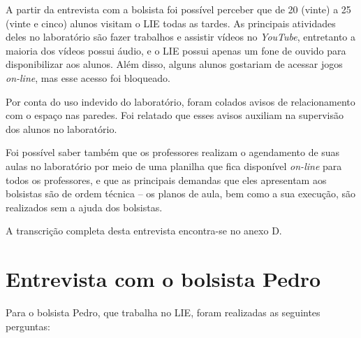 A partir da entrevista com a bolsista foi possível perceber que de 20 (vinte) a 25 (vinte e cinco) alunos visitam o LIE todas as tardes. As principais atividades deles no laboratório são fazer trabalhos e assistir vídeos no \textit{YouTube}, entretanto a maioria dos vídeos possui áudio, e o LIE possui apenas um fone de ouvido para disponibilizar aos alunos. Além disso, alguns alunos gostariam de acessar jogos \textit{on-line}, mas esse acesso foi bloqueado.

Por conta do uso indevido do laboratório, foram colados avisos de relacionamento com o espaço nas paredes. Foi relatado que esses avisos auxiliam na supervisão dos alunos no laboratório.

Foi possível saber também que os professores realizam o agendamento de suas aulas no laboratório por meio de uma planilha que fica disponível \textit{on-line} para todos os professores, e que as principais demandas que eles apresentam aos bolsistas são de ordem técnica -- os planos de aula, bem como a sua execução, são realizados sem a ajuda dos bolsistas.

A transcrição completa desta entrevista encontra-se no anexo D.

\section{Entrevista com o bolsista Pedro}\label{chp:LABEL_CHP_ENT_SEC_PED}

Para o bolsista Pedro, que trabalha no LIE, foram realizadas as seguintes perguntas:

